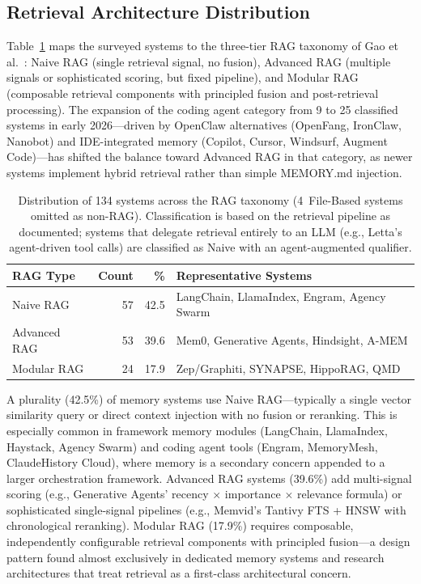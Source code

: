 \subsection{Retrieval Architecture Distribution}
\label{sec:rag-distribution}

Table~\ref{tab:rag-distribution} maps the surveyed systems to the three-tier
RAG taxonomy of Gao et al.~\cite{gao2023rag}: Naive RAG (single retrieval
signal, no fusion), Advanced RAG (multiple signals or sophisticated
scoring, but fixed pipeline), and Modular RAG (composable retrieval
components with principled fusion and post-retrieval processing).  The
expansion of the coding agent category from 9 to 25 classified systems
in early 2026---driven by OpenClaw alternatives (OpenFang, IronClaw,
Nanobot) and IDE-integrated memory (Copilot, Cursor, Windsurf,
Augment Code)---has
shifted the balance toward Advanced RAG in that category, as newer
systems implement hybrid retrieval rather than simple MEMORY.md
injection.

\begin{table}[!t]
\centering
\caption{Distribution of 134 systems across the RAG taxonomy \cite{gao2023rag} (4~File-Based systems omitted as non-RAG). Classification is based on the retrieval pipeline as documented; systems that delegate retrieval entirely to an LLM (e.g., Letta's agent-driven tool calls) are classified as Naive with an agent-augmented qualifier.}
\label{tab:rag-distribution}
\small
\begin{tabular}{@{}lrrp{4.0cm}@{}}
\toprule
\textbf{RAG Type} & \textbf{Count} & \textbf{\%} & \textbf{Representative Systems} \\
\midrule
Naive RAG       & 57 & 42.5 & LangChain, LlamaIndex, Engram, Agency Swarm \\
Advanced RAG    & 53 & 39.6 & Mem0, Generative Agents, Hindsight, A-MEM \\
Modular RAG     & 24 & 17.9 & Zep/Graphiti, SYNAPSE, HippoRAG, QMD \\
\bottomrule
\end{tabular}
\end{table}

A plurality (42.5\%) of memory systems use Naive RAG---typically a single
vector similarity query or direct context injection with no fusion or
reranking. This is especially common in framework memory modules (LangChain,
LlamaIndex, Haystack, Agency Swarm) and coding agent tools (Engram,
MemoryMesh, ClaudeHistory Cloud), where memory is a secondary concern appended
to a larger orchestration framework. Advanced RAG systems (39.6\%) add
multi-signal scoring (e.g., Generative Agents' recency $\times$ importance
$\times$ relevance formula) or sophisticated single-signal pipelines (e.g.,
Memvid's Tantivy FTS + HNSW with chronological reranking). Modular RAG
(17.9\%) requires composable, independently configurable retrieval components
with principled fusion---a design pattern found almost exclusively in dedicated
memory systems and research architectures that treat retrieval as a first-class
architectural concern.

